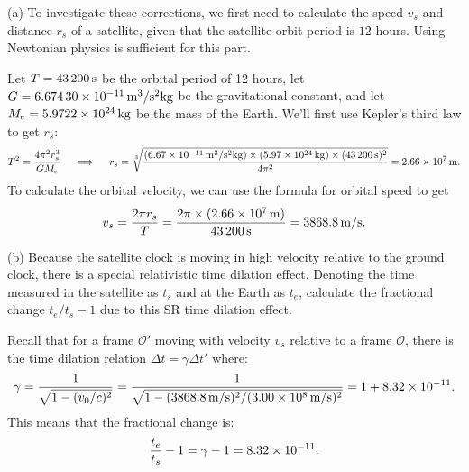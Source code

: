 \documentclass{../../templates/lkx_pset}
\begin{document}
\begin{parts}
	\begin{part}{(a)}
		To investigate these corrections, we first need to calculate the speed $v_s$ and distance $r_s$ of a satellite, given that the satellite orbit period is $12$ hours. Using Newtonian physics is sufficient for this part.
	\end{part}

	Let $T=\ssi{43200}$ be the orbital period of 12 hours, let $G=\Gsi{6.67430e-11}$ be the gravitational constant, and let $M_e = \kgsi{5.9722e24}$ be the mass of the Earth. We'll first use Kepler's third law to get $r_s$:
	\[
    T^2 = \frac{4\pi^2 r_s^3}{GM_e}\quad\implies\quad r_s=\sqrt[3]{\frac{(\Gsi{6.67e-11})\times (\kgsi{5.97e24})\times (\ssi{43200})^2}{4\pi^2}} = \msi{2.66e7}.
	\]
	To calculate the orbital velocity, we can use the formula for orbital speed to get
	\[
    v_s = \frac{2\pi r_s}{T} = \frac{2\pi\times (\msi{2.66e7})}{\ssi{43200}} = \mpssi{3868.8}.
	\]

	\begin{part}{(b)}
		Because the satellite clock is moving in high velocity relative to the ground clock, there is a special relativistic time dilation effect. Denoting the time measured in the satellite as $t_s$ and at the Earth as $t_e$, calculate the fractional change $t_e / t_s - 1$ due to this SR time dilation effect.
	\end{part}

	Recall that for a frame $\mathcal{O}'$ moving with velocity $v_s$ relative to a frame $\mathcal{O}$, there is the time dilation relation $\Delta t = \gamma \Delta t'$ where:
	\[
    \gamma = \frac{1}{\sqrt{1 - (v_0/c)^2}} = \frac{1}{\sqrt{1 - (\mpssi{3868.8})^2 / (\mpssi{3.00e8})^2}} = 1 + \unitsi{8.32e-11}.
	\]
	This means that the fractional change is:
	\[
    \frac{t_e}{t_s} - 1 = {\gamma} - 1 = \unitsi{8.32e-11}.
	\]


\end{parts}
\end{document}
